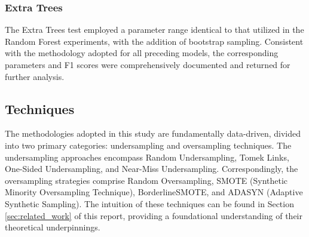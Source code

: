 \documentclass[journal]{IEEEtran}
\begin{document}
	\subsubsection{Extra Trees}
	The Extra Trees test employed a parameter range identical to that utilized in the Random Forest experiments, with the addition of bootstrap sampling. Consistent with the methodology adopted for all preceding models, the corresponding parameters and F1 scores were comprehensively documented and returned for further analysis.


\subsection{Techniques}

	The methodologies adopted in this study are fundamentally data-driven, 
	divided into two primary categories: undersampling and oversampling techniques. 
	The undersampling approaches encompass Random Undersampling, Tomek Links, One-Sided Undersampling, and Near-Miss Undersampling. 
	Correspondingly, the oversampling strategies comprise Random Oversampling, SMOTE (Synthetic Minority Oversampling Technique), BorderlineSMOTE, and ADASYN (Adaptive Synthetic Sampling). 
	The intuition of these techniques can be found in Section \ref{sec:related_work} of this report, providing a foundational understanding of their theoretical underpinnings.
		
\end{document}
